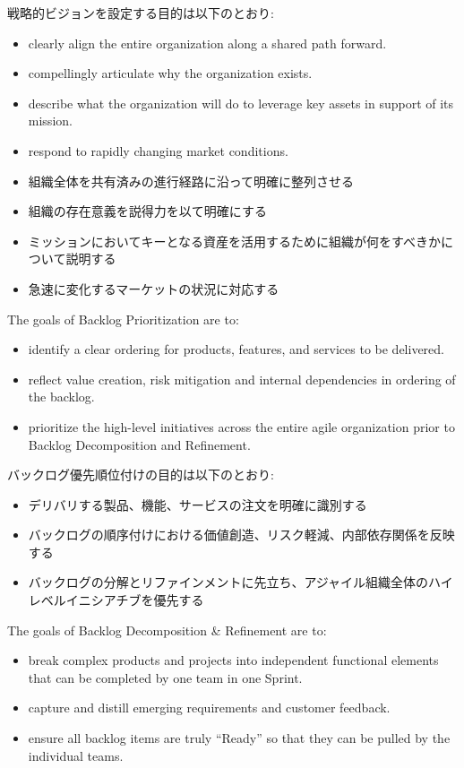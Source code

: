 \documentclass[12pt,a4paper,parskip=full]{scrartcl}
\begin{document}
戦略的ビジョンを設定する目的は以下のとおり:
\begin{itemize}
\item clearly align the entire organization along a shared path forward.
\item compellingly articulate why the organization exists.
\item describe what the organization will do to leverage key assets in
support of its mission.
\item respond to rapidly changing market conditions.
\end{itemize}
\fi
\begin{itemize}
\item 組織全体を共有済みの進行経路に沿って明確に整列させる
\item 組織の存在意義を説得力を以て明確にする
\item ミッションにおいてキーとなる資産を活用するために組織が何をすべきかについて説明する
\item 急速に変化するマーケットの状況に対応する
\end{itemize}
The goals of Backlog Prioritization are to:
\begin{itemize}
\item identify a clear ordering for products, features, and services to be
delivered.
\item reflect value creation, risk mitigation and internal dependencies in
ordering of the backlog.
\item prioritize the high-level initiatives across the entire agile
organization prior to Backlog Decomposition and Refinement.
\end{itemize}
\fi
バックログ優先順位付けの目的は以下のとおり:
\begin{itemize}
\item デリバリする製品、機能、サービスの注文を明確に識別する
\item バックログの順序付けにおける価値創造、リスク軽減、内部依存関係を反映する
\item バックログの分解とリファインメントに先立ち、アジャイル組織全体のハイレベルイニシアチブを優先する
\end{itemize}
The goals of Backlog Decomposition \& Refinement are to:
\begin{itemize}
\item break complex products and projects into independent functional
elements that can be completed by one team in one Sprint.
\item capture and distill emerging requirements and customer feedback.
\item ensure all backlog items are truly ``Ready'' so that they can be
pulled by the individual teams.
\end{itemize}
\end{document}
